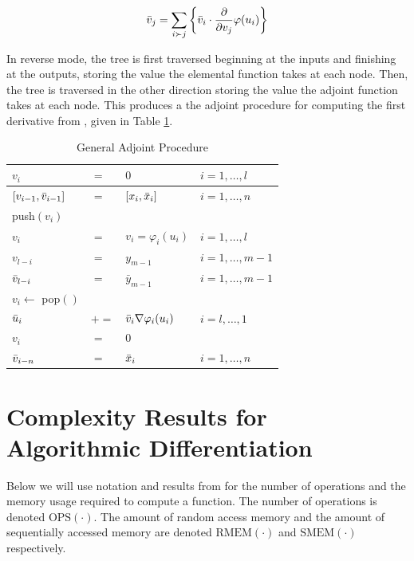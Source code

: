 \documentclass{article}
\begin{document}
\begin{equation*}
    \Bar{v}_j = \sum_{i \succ j} \left\{ \Bar{v}_i \cdot \frac{\partial}{\partial v_j} \varphi(u_i) \right\}
\end{equation*}

In reverse mode, the tree is first traversed beginning at the inputs and finishing at the outputs, storing the value the elemental function takes at each node. Then, the tree is traversed in the other direction storing the value the adjoint function takes at each node. This produces a the adjoint procedure for computing the first derivative from \cite{dhamarticle}, given in Table \ref{tab:ap}.

\begin{table}[h]
    \centering
    \begin{tabular}{|llll|}
        \hline
        $v_{i}$ & $=$ & $0$ & $i = 1, \ldots, l$ \\
        \hline
        $[v_{i-1}, \Bar{v}_{i-1}]$ & $=$ & $[x_{i}, \Bar{x}_{i}]$ & $i = 1, \ldots, n$ \\
        \hline
        push$(v_i)$ & & & \\
        $v_{i}$ & $=$ & $v_i = \varphi_i (u_i)$ & $i = 1, \ldots, l$ \\
        \hline
        $v_{l-i}$ & $=$ & $y_{m-1}$ & $i = 1, \ldots, m-1$ \\
        $\Bar{v}_{l-i}$ & $=$ & $\bar{y}_{m-1}$ & $i = 1, \ldots, m-1$ \\
        \hline
        $v_i \leftarrow$ pop$()$ & & & \\
        $\Bar{u}_i$ & $+=$ & $\Bar{v}_i \nabla \varphi_i (u_i)$ & $i = l, \ldots, 1$ \\
        $v_i$ & $=$ & $0$ & \\
        \hline
        $\Bar{v}_{i-n}$ & $=$ & $\Bar{x}_i$ & $i = 1, \ldots, n$ \\
        \hline
    \end{tabular}
    \caption{General Adjoint Procedure}
    \label{tab:ap}
\end{table}

\section{Complexity Results for Algorithmic Differentiation}

Below we will use notation and results from \cite{dhamarticle} for the number of operations and the memory usage required to compute a function. The number of operations is denoted $\text{OPS}(\cdot)$. The amount of random access memory and the amount of sequentially accessed memory are denoted $\text{RMEM}(\cdot)$ and $\text{SMEM}(\cdot)$ respectively. 
\end{document}

